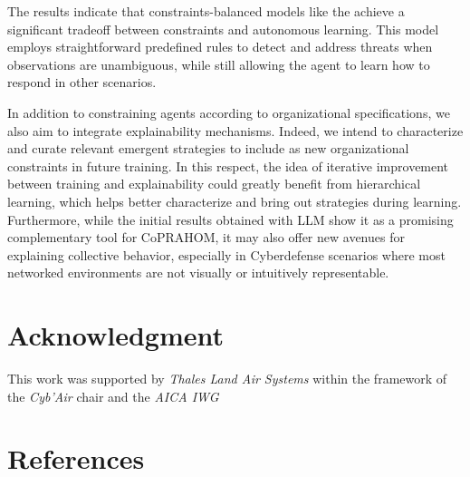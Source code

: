 \documentclass[conference]{IEEEtran}
\begin{document}
The results indicate that constraints-balanced models like the  achieve a significant tradeoff between constraints and autonomous learning. This model employs straightforward predefined rules to detect and address threats when observations are unambiguous, while still allowing the agent to learn how to respond in other scenarios.

In addition to constraining agents according to organizational specifications, we also aim to integrate explainability mechanisms. Indeed, we intend to characterize and curate relevant emergent strategies to include as new organizational constraints in future training. In this respect, the idea of iterative improvement between training and explainability could greatly benefit from hierarchical learning, which helps better characterize and bring out strategies during learning. Furthermore, while the initial results obtained with LLM show it as a promising complementary tool for CoPRAHOM, it may also offer new avenues for explaining collective behavior, especially in Cyberdefense scenarios where most networked environments are not visually or intuitively representable.




\section*{Acknowledgment}

This work was supported by \emph{Thales Land Air Systems} within the framework of the \emph{Cyb'Air} chair and the \emph{AICA IWG}

\section*{References}

% 



\end{document}
